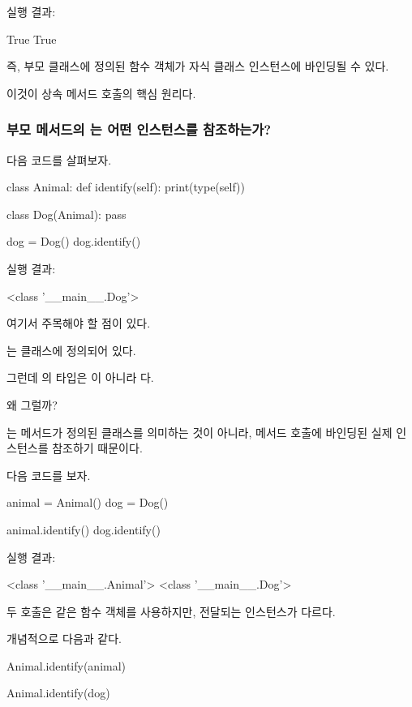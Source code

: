 실행 결과:

\begin{dhkzsh}
True
True
\end{dhkzsh}

즉, 부모 클래스에 정의된 함수 객체가 자식 클래스 인스턴스에 바인딩될 수 있다.

이것이 상속 메서드 호출의 핵심 원리다.

\subsubsection{부모 메서드의 는 어떤 인스턴스를 참조하는가?}

다음 코드를 살펴보자.

\begin{dhkcode}
class Animal:
    def identify(self):
        print(type(self))


class Dog(Animal):
    pass


dog = Dog()
dog.identify()
\end{dhkcode}

실행 결과:

\begin{dhkzsh}
<class '__main__.Dog'>
\end{dhkzsh}

여기서 주목해야 할 점이 있다.

는  클래스에 정의되어 있다.

그런데 의 타입은 이 아니라 다.

왜 그럴까?

는 메서드가 정의된 클래스를 의미하는 것이 아니라, 메서드 호출에 바인딩된 실제 인스턴스를 참조하기 때문이다.

다음 코드를 보자.

\begin{dhkcode}
animal = Animal()
dog = Dog()

animal.identify()
dog.identify()
\end{dhkcode}

실행 결과:

\begin{dhkzsh}
<class '__main__.Animal'>
<class '__main__.Dog'>
\end{dhkzsh}

두 호출은 같은 함수 객체를 사용하지만, 전달되는 인스턴스가 다르다.

개념적으로 다음과 같다.

\begin{dhkcode}
Animal.identify(animal)

Animal.identify(dog)
\end{dhkcode}

